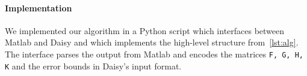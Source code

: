 
\paragraph{Implementation}

We implemented our algorithm in a Python script which interfaces between Matlab
and Daisy and which implements the high-level structure from~\autoref{lst:alg}.
The interface parses the output from Matlab and encodes the matrices \texttt{F,
G, H, K} and the error bounds in Daisy's input format.

